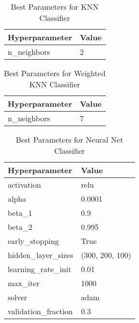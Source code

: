 \documentclass[a4paper, 12pt]{report}
\begin{document}
\begin{table}[H]
    \centering
    \caption{Best Parameters for KNN Classifier}
    \label{tab:best_parameters_knn_LC_Glass}
    \begin{tabular}{|l|l|}
    \hline
    \textbf{Hyperparameter} & \textbf{Value} \\ \hline
    n\_neighbors & 2 \\ \hline
    \end{tabular}
\end{table}

\begin{table}[H]
    \centering
    \caption{Best Parameters for Weighted KNN Classifier}
    \label{tab:best_parameters_weighted_knn_LC_Glass}
    \begin{tabular}{|l|l|}
    \hline
    \textbf{Hyperparameter} & \textbf{Value} \\ \hline
    n\_neighbors & 7 \\ \hline
    \end{tabular}
\end{table}

\begin{table}[H]
    \centering
    \caption{Best Parameters for Neural Net Classifier}
    \label{tab:best_parameters_neural_net_LC_Glass}
    \begin{tabular}{|l|l|}
    \hline
    \textbf{Hyperparameter} & \textbf{Value} \\ \hline
    activation & relu \\ \hline
    alpha & 0.0001 \\ \hline
    beta\_1 & 0.9 \\ \hline
    beta\_2 & 0.995 \\ \hline
    early\_stopping & True \\ \hline
    hidden\_layer\_sizes & (300, 200, 100) \\ \hline
    learning\_rate\_init & 0.01 \\ \hline
    max\_iter & 1000 \\ \hline
    solver & adam \\ \hline
    validation\_fraction & 0.3 \\ \hline
    \end{tabular}
\end{table}
\end{document}
